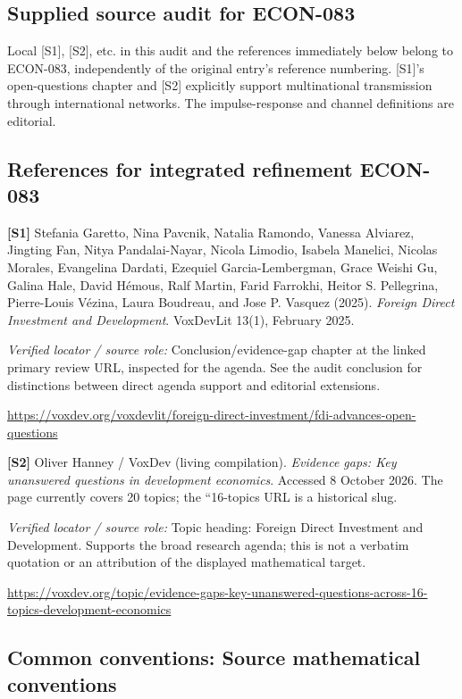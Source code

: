 \documentclass[11pt,a4paper]{article}
\begin{document}
\subsection*{Supplied source audit for ECON-083}
Local [S1], [S2], etc. in this audit and the references immediately below
belong to ECON-083, independently of the original entry's reference numbering.
[S1]'s open-questions chapter and [S2] explicitly support multinational transmission through international networks. The impulse-response and channel definitions are editorial.
\subsection*{References for integrated refinement ECON-083}
{\footnotesize\raggedright
\par\noindent\textbf{[S1]} Stefania Garetto, Nina Pavcnik, Natalia Ramondo, Vanessa Alviarez, Jingting Fan, Nitya Pandalai-Nayar, Nicola Limodio, Isabela Manelici, Nicolas Morales, Evangelina Dardati, Ezequiel Garcia-Lembergman, Grace Weishi Gu, Galina Hale, David Hémous, Ralf Martin, Farid Farrokhi, Heitor S. Pellegrina, Pierre-Louis Vézina, Laura Boudreau, and Jose P. Vasquez (2025). \emph{Foreign Direct Investment and Development}. VoxDevLit 13(1), February 2025.\par \textit{Verified locator / source role:} Conclusion/evidence-gap chapter at the linked primary review URL, inspected for the agenda. See the audit conclusion for distinctions between direct agenda support and editorial extensions.\par \url{https://voxdev.org/voxdevlit/foreign-direct-investment/fdi-advances-open-questions}\par\smallskip
\par\noindent\textbf{[S2]} Oliver Hanney / VoxDev (living compilation). \emph{Evidence gaps: Key unanswered questions in development economics}. Accessed 8 October 2026. The page currently covers 20 topics; the ``16-topics URL is a historical slug.\par \textit{Verified locator / source role:} Topic heading: Foreign Direct Investment and Development. Supports the broad research agenda; this is not a verbatim quotation or an attribution of the displayed mathematical target.\par \url{https://voxdev.org/topic/evidence-gaps-key-unanswered-questions-across-16-topics-development-economics}\par\smallskip
}

\subsection*{Common conventions: Source mathematical conventions}
\end{document}
